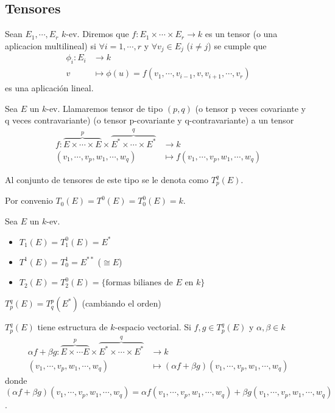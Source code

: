 
\subsection{Tensores}

\begin{defi}
	Sean $E_1,\cdots , E_r$ $k$-ev. Diremos que
	$f \colon E_1 \times \cdots \times E_r \to k$ es un tensor (o una aplicacion
	multilineal) si $\forall i=1,\cdots , r$ y $\forall v_j \in E_j$ ($i \neq j$)
	se cumple que
	\[
	\begin{aligned}
	\phi_i \colon E_i &\to k \\
	v &\mapsto \phi(u)=f(v_1,\cdots , v_{i-1}, v, v_{i+1}, \cdots , v_r)
	\end{aligned}
	\]
	es una aplicación lineal.
\end{defi}
\begin{defi}
	Sea $E$ un $k$-ev. Llamaremos tensor de tipo $(p,q)$ (o tensor p veces
	covariante y q veces contravariante) (o tensor p-covariante y q-contravariante)
	a un tensor
	\[
	\begin{aligned}
	f \colon \overbrace{E \times \cdots \times E}^p\times
	\overbrace{E^* \times \cdots \times E^*}^q&\to k \\
	(v_1, \cdots, v_p, w_1, \cdots, w_q) &\mapsto
	f(v_1,\cdots,v_p,w_1,\cdots,w_q)
	\end{aligned}
	\]
\end{defi}
\begin{obs}
	Al conjunto de tensores  de este tipo se le denota como $T_p^q(E)$.
\end{obs}
\begin{obs}
	Por convenio $T_0(E) = T^0(E) = T_0^0(E) = k$.
\end{obs}
\begin{example}
	Sea $E$ un $k$-ev.
	\begin{itemize}
		\item $T_1(E) = T_1^0(E) = E^*$
		\item $T^1(E) = T_0^1 = E^{**}$ ($\cong E$)
		\item $T_2(E) = T_2^0(E) = \{\text{formas bilianes de } E \text{ en } k\}$
	\end{itemize}
\end{example}
\begin{prop}
	$T_p^q(E) = T_q^p(E^*)$ (cambiando el orden)
\end{prop}
\begin{prop}
	$T_p^q(E)$ tiene estructura de $k$-espacio vectorial. Si $f, g \in T_p^q(E)$ y
	$\alpha , \beta \in k$
	\[
	\begin{aligned}
	\alpha f + \beta g \colon \overbrace{E \times \cdots E}^p \times
	\overbrace{E^* \times \cdots \times E^*}^q &\to k \\
	(v_1, \cdots, v_p, w_1, \cdots, w_q) &\mapsto (\alpha f + \beta g)
	(v_1, \cdots, v_p, w_1, \cdots, w_q)
	\end{aligned}
	\]
	donde $(\alpha f + \beta g) (v_1, \cdots, v_p, w_1, \cdots, w_q) =
	\alpha f(v_1, \cdots, v_p, w_1, \cdots, w_q) + \beta
	g(v_1, \cdots, v_p, w_1, \cdots, w_q)$.
\end{prop}
